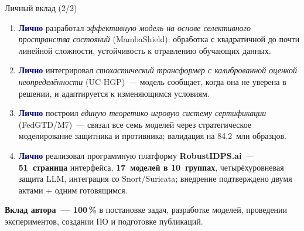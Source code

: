 \documentclass[10pt,aspectratio=169]{beamer}
\newcommand{\hl}[1]{\textcolor{accent}{\textbf{#1}}}
\newcommand{\bn}[1]{\textcolor{navy}{\textbf{#1}}}
\begin{document}
\begin{frame}{Личный вклад (2/2)}
\begin{center}
\begin{minipage}{0.92\textwidth}
\footnotesize
\begin{enumerate}\setlength\itemsep{3pt}\setcounter{enumi}{4}
\item \bn{Лично} разработал \emph{эффективную модель на
основе селективного пространства состояний} (MambaShield):
обработка с квадратичной до почти линейной сложности,
устойчивость к отравлению обучающих данных.

\item \bn{Лично} интегрировал \emph{стохастический
трансформер с калиброванной оценкой неопределённости}
(UC-HGP)~--- модель сообщает, когда она не уверена в
решении, и адаптируется к изменяющимся условиям.

\item \bn{Лично} построил \emph{единую теоретико-игровую
систему сертификации} (FedGTD/M7)~--- связал все семь
моделей через стратегическое моделирование защитника и
противника; валидация на 84{,}2~млн образцов.

\item \bn{Лично} реализовал программную платформу
\hl{RobustIDPS.ai}~--- \hl{51~страница} интерфейса,
\hl{17~моделей в 10~группах}, четырёхуровневая защита LLM,
интеграция со Snort/Suricata; внедрение подтверждено
двумя актами + одним готовящимся.
\end{enumerate}
\smallskip
\begin{block}{}
\scriptsize\textbf{Вклад автора~--- 100\,\%} в постановке задач,
разработке моделей, проведении экспериментов, создании ПО и
подготовке публикаций.
\end{block}
\end{minipage}
\end{center}
\end{frame}
\end{document}
